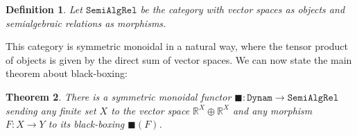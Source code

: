 \documentclass{compositionalityarticle}
\newcommand{\R}{\mathbb{R}}
\newcommand{\Dynam}{\mathtt{Dynam}}
\newcommand{\SemiAlgRel}{\mathtt{SemiAlgRel}}
\newcommand{\maps}{\colon}
\theoremstyle{compositionality}
\newtheorem{thm}{Theorem}
\newtheorem{defn}[thm]{Definition}
\theoremstyle{remark}
\begin{document}
\begin{defn}
Let $\SemiAlgRel$ be the category with vector spaces as objects and semialgebraic relations as morphisms.
\end{defn}

This category is symmetric monoidal in a natural way, where the tensor product of objects is given by the direct sum of vector spaces.   We can now state the main theorem about black-boxing:

\begin{thm}
\label{thm:black}
There is a symmetric monoidal functor $\blacksquare \maps \Dynam \to \SemiAlgRel$
sending any finite set $X$ to the vector space $\R^X \oplus \R^X$ and any morphism $F \maps X \to Y$ to its black-boxing $\blacksquare(F)$.
\end{thm}
\end{document}
